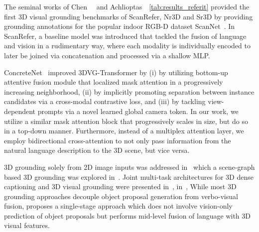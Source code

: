 \documentclass[10pt,twocolumn,letterpaper]{article}
\begin{document}
The seminal works of Chen~\etal~\cite{chen2020scanrefer} and Achlioptas~\etal~\ref{tab:results_referit} provided the first 3D visual grounding benchmarks of ScanRefer, Nr3D and Sr3D by providing grounding annotations for the popular indoor RGB-D dataset ScanNet~\cite{dai2017scannet}. In ScanRefer, a baseline model was introduced that tackled the fusion of language and vision in a rudimentary way, where each modality is individually encoded to later be joined via concatenation and processed via a shallow MLP. 

ConcreteNet~\cite{unal2023ways} improved 3DVG-Transformer by (i) by utilizing bottom-up attentive fusion module that localized mask attention in a progressively increasing neighborhood, (ii) by implicitly promoting separation between instance candidates via a cross-modal contrastive loss, and (iii) by tackling view-dependent prompts via a novel learned global camera token. In our work, we utilize a similar mask attention block that progressively scales in size, but do so in a top-down manner. Furthermore, instead of a multiplex attention layer, we employ bidirectional cross-attention to not only pass information from the natural language description to the 3D scene, but vice versa.

3D grounding solely from 2D image inputs was addressed in~\cite{prabhudesai2020embodied} which a scene-graph based 3D grounding was explored in~\cite{feng2021free}. Joint multi-task architectures for 3D dense captioning and 3D visual grounding were presented in~\cite{cai20223djcg}, in~\cite{chen2022d3net}, While most 3D grounding approaches decouple object proposal generation from verbo-visual fusion, \cite{luo20223d} proposes a single-stage approach which does not involve vision-only prediction of object proposals but performs mid-level fusion of language with 3D visual features.
\end{document}
